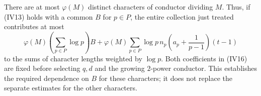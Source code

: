 There are at most $\varphi(M)$ distinct characters of conductor
dividing $M$. Thus, if (IV13) holds with a common $B$ for
$p\in P$, the entire collection just treated contributes at
most
\[
 \varphi(M)\left(\sum_{p\in P}\log p\right)B
  +\varphi(M)\sum_{p\in P}\log p\,
       n_p\left(a_p+\frac1{p-1}\right)(t-1)                 \tag{IV16}
\]
to the sums of character lengths weighted by $\log p$.
Both coefficients in (IV16) are fixed before selecting $q,d$
and the growing $2$-power conductor. This establishes the
required dependence on $B$ for these characters; it does not
replace the separate estimates for the other characters.


